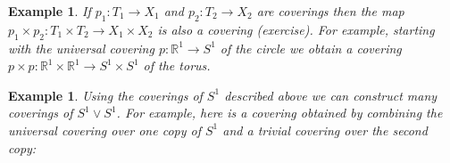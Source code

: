 \documentclass[11pt, letterpaper, oneside]{report}
\theoremstyle{pplain}
\theoremstyle{ddefinition}
\newtheorem{example}[theorem]{Example}
\theoremstyle{nnn}
\theoremstyle{eexercise}
\newcommand{\R}{{\mathbb R}}
\begin{document}
\begin{example}
If $p_{1}\colon T_{1} \to X_{1}$ and $p_{2}\colon T_{2}\to X_{2}$ are coverings then 
the map $p_{1}\times p_{2}\colon T_{1}\times T_{2} \to X_{1}\times X_{2}$ is also 
a covering (exercise). For example, starting with the universal covering $p\colon \R^{1}\to S^{1}$
of the circle we obtain a covering  $p\times p \colon \R^{1}\times \R^{1} \to S^{1}\times S^{1}$ of the torus. 
\end{example}

\begin{example}
Using the coverings of $S^{1}$ described above we can construct  many coverings 
of $S^{1} \vee S^{1}$. For example, here is a covering obtained by combining the universal 
covering over one copy of $S^{1}$ and a trivial covering over the second copy:
 
\end{example}
\end{document}
